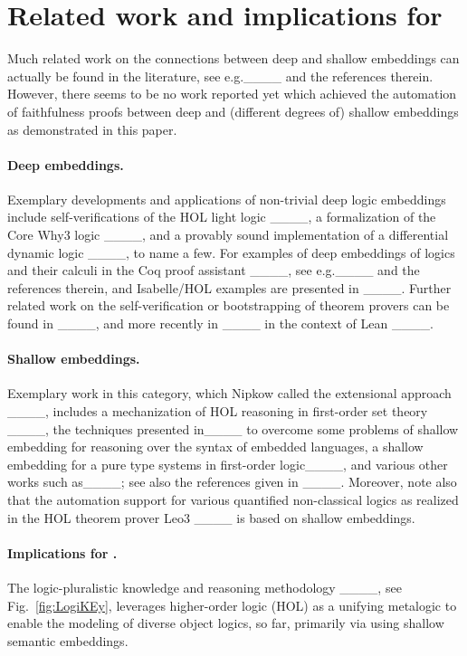 \section{Related work and implications for \logikey}
\label{sec:logikey}

Much related work on the connections between deep and shallow embeddings can actually be found in the literature, see e.g.____ and the references therein. However, there seems to be no work reported yet which achieved the automation of faithfulness proofs between deep and (different degrees of) shallow embeddings as demonstrated in this paper. 



\paragraph{Deep embeddings.}
Exemplary developments and applications of non-trivial deep logic embeddings include self-verifications of the HOL light logic ____, a formalization of the Core Why3 logic ____, and a provably sound implementation of a differential dynamic logic ____, to name a few. For examples of deep embeddings of logics and their calculi in the Coq proof assistant ____, see e.g.____ and the references therein, and Isabelle/HOL examples are presented in ____. Further related work on the self-verification or bootstrapping of theorem provers 
can be found in ____, and more recently in ____ in the context of Lean ____.

\paragraph{Shallow embeddings.}
Exemplary work in this category, which Nipkow called the extensional approach ____, includes a mechanization of HOL reasoning in first-order set theory ____, the techniques presented in____ to overcome some problems of shallow embedding for reasoning over the syntax of embedded languages, a shallow embedding for a pure type systems in first-order logic____, and various other works such as____; see also the references given in ____.
Moreover, note also that the automation support for various quantified non-classical logics as realized in the HOL theorem prover Leo3 ____ is based on shallow embeddings. 


\paragraph{Implications for \logikey.}
The logic-pluralistic knowledge and reasoning methodology \logikey ____, see Fig.~\ref{fig:LogiKEy}, leverages higher-order logic (HOL) as a unifying metalogic to enable the modeling of diverse object logics, so far,  primarily via using shallow semantic embeddings. 

